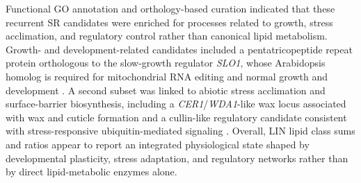 \documentclass[9pt,twocolumn,twoside]{rilabRxiv}
\begin{document}
Functional GO annotation and orthology-based curation indicated that these recurrent SR candidates were enriched for processes related to growth, stress acclimation, and regulatory control rather than canonical lipid metabolism. Growth- and development-related candidates included a pentatricopeptide repeat protein orthologous to the slow-growth regulator \textit{SLO1}, whose Arabidopsis homolog is required for mitochondrial RNA editing and normal growth and development \citep{Sung2010}. A second subset was linked to abiotic stress acclimation and surface-barrier biosynthesis, including a \textit{CER1}/\textit{WDA1}-like wax locus associated with wax and cuticle formation \citep{Jung2006WDA1} and a cullin-like regulatory candidate consistent with stress-responsive ubiquitin-mediated signaling \citep{WangXie2024Cullin}. Overall, LIN lipid class sums and ratios appear to report an integrated physiological state shaped by developmental plasticity, stress adaptation, and regulatory networks rather than by direct lipid-metabolic enzymes alone.
\end{document}
